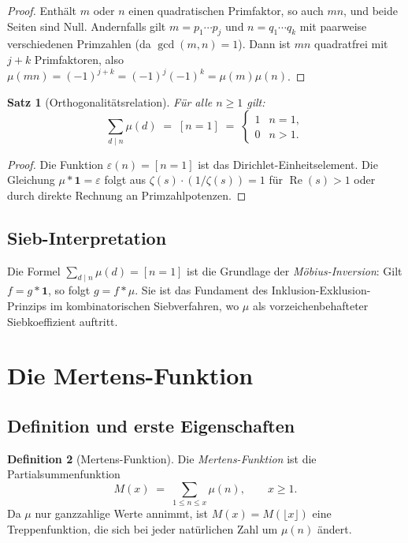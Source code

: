 \documentclass[12pt,a4paper]{amsart}
\newtheorem{theorem}{Satz}[section]
\theoremstyle{definition}
\newtheorem{definition}[theorem]{Definition}
\begin{document}
\begin{proof}
Enthält $m$ oder $n$ einen quadratischen Primfaktor, so auch $mn$, und beide
Seiten sind Null.  Andernfalls gilt $m = p_1 \cdots p_j$ und
$n = q_1 \cdots q_k$ mit paarweise verschiedenen Primzahlen (da $\gcd(m,n)=1$).
Dann ist $mn$ quadratfrei mit $j+k$ Primfaktoren, also
$\mu(mn) = (-1)^{j+k} = (-1)^j(-1)^k = \mu(m)\mu(n)$.
\end{proof}

\begin{theorem}[Orthogonalitätsrelation]
\label{satz:mobius-ortho}
Für alle $n \ge 1$ gilt:
\[
  \sum_{d \mid n} \mu(d) \;=\; [n = 1] \;=\;
  \begin{cases} 1 & n=1, \\ 0 & n>1. \end{cases}
\]
\end{theorem}

\begin{proof}
Die Funktion $\varepsilon(n) = [n=1]$ ist das Dirichlet-Einheitselement.
Die Gleichung $\mu * \mathbf{1} = \varepsilon$ folgt aus
$\zeta(s) \cdot (1/\zeta(s)) = 1$ für $\operatorname{Re}(s)>1$
oder durch direkte Rechnung an Primzahlpotenzen.
\end{proof}

\subsection{Sieb-Interpretation}

Die Formel $\sum_{d \mid n}\mu(d) = [n=1]$ ist die Grundlage der
\emph{Möbius-Inversion}: Gilt $f = g * \mathbf{1}$, so folgt $g = f * \mu$.
Sie ist das Fundament des Inklusion-Exklusion-Prinzips im kombinatorischen
Siebverfahren, wo $\mu$ als vorzeichenbehafteter Siebkoeffizient auftritt.

\section{Die Mertens-Funktion}
\label{sec:mertens-funktion}

\subsection{Definition und erste Eigenschaften}

\begin{definition}[Mertens-Funktion]
\label{def:mertens}
Die \emph{Mertens-Funktion} ist die Partialsummenfunktion
\[
  M(x) \;=\; \sum_{1 \le n \le x} \mu(n), \qquad x \ge 1.
\]
Da $\mu$ nur ganzzahlige Werte annimmt, ist $M(x) = M(\lfloor x \rfloor)$
eine Treppenfunktion, die sich bei jeder natürlichen Zahl um $\mu(n)$
ändert.
\end{definition}
\end{document}
